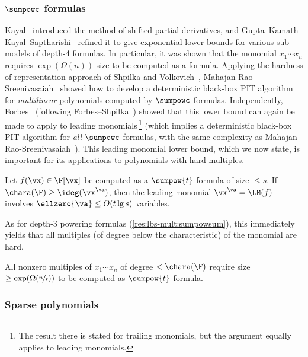 \documentclass[11pt]{article}
\numberwithin{equation}{section}
\theoremstyle{definition}
\theoremstyle{plain}
\begin{document}
\subsubsection{\texorpdfstring{$\sumpowc$ formulas}{sums of powers of low-degree polynomials}}

Kayal~\cite{Kayal12} introduced the method of shifted partial derivatives, and Gupta--Kamath--Kayal--Saptharishi~\cite{GuptaKKS14} refined it to give exponential lower bounds for various sub-models of depth-4 formulas.  In particular, it was shown that the monomial $x_1\cdots x_n$ requires
%
$\exp(\Omega(n))$ size   %
to be computed as a \sumpowc formula.  Applying the hardness of representation approach of Shpilka and Volkovich~\cite{ShpilkaVolkovich09}, Mahajan-Rao-Sreenivasaiah~\cite{MahajanRS14} showed how to develop a deterministic black-box PIT algorithm for \emph{multilinear} polynomials computed by $\sumpowc$ formulas.  Independently, Forbes~\cite{Forbes15} (following Forbes--Shpilka~\cite{ForbesShpilka13a}) showed that this lower bound can again be made to apply to leading monomials\,\footnote{The result there is stated for trailing monomials, but the argument equally applies to leading monomials.} (which implies a deterministic black-box PIT algorithm for \emph{all} $\sumpowc$ formulas, with the same complexity as Mahajan-Rao-Sreenivasaiah~\cite{MahajanRS14}). This leading monomial lower bound, which we now state, is important for its applications to polynomials with hard multiples.

\begin{theoremwp}\label{res:sumpowsumprodt_TM-ubs}
        Let $f(\vx)\in\F[\vx]$ be computed as a $\sumpow{t}$ formula of size $\le s$.  If $\chara(\F)\ge \ideg(\vx^\va)$, then the leading monomial $\vx^\va=\LM(f)$ involves $\ellzero{\va}\le O(t\lg s)$ variables.
\end{theoremwp}

As for depth-$3$ powering formulas (\autoref{res:lbs-mult:sumpowsum}), this immediately yields that all multiples (of degree below the characteristic) of the monomial are hard.

\begin{corollarywp}\label{res:lbs-mult:sumpowt}
        All nonzero multiples of $x_1\cdots x_n$ of degree $<\chara(\F)$ require size $\ge\exp(\Omega(\nicefrac{n}{t}))$ to be computed as $\sumpow{t}$ formula.
\end{corollarywp}

\subsubsection{Sparse polynomials}
\end{document}
